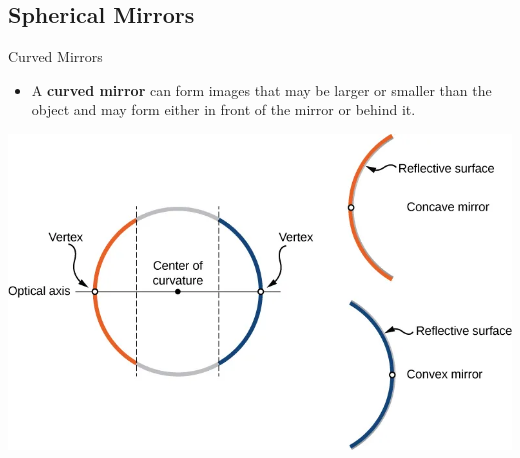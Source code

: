 \documentclass{beamer}
\begin{document}
\subsection{Spherical Mirrors}
\begin{frame}{Curved Mirrors }
	\begin{itemize}
		\item A \textbf{curved mirror} can form images that may be larger or smaller than the object and may form either in front of the mirror or behind it.
	\end{itemize}
	\begin{center}
		\includegraphics[scale=0.3]{40.png}
	\end{center}
\end{frame}
\end{document}
